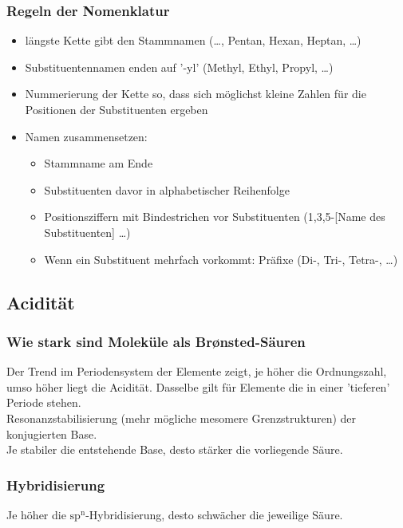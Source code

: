 \documentclass[a4paper, fleqn]{article}
\begin{document}
\subsubsection{Regeln der Nomenklatur}
\begin{itemize}
  \item l\"angste Kette gibt den Stammnamen (\dots , Pentan, Hexan, Heptan, \dots)
  \item Substituentennamen enden auf '-yl' (Methyl, Ethyl, Propyl, \dots)
  \item Nummerierung der Kette so, dass sich m\"oglichst kleine Zahlen f\"ur die Positionen der Substituenten ergeben
  \item Namen zusammensetzen: \begin{itemize}
    \item Stammname am Ende 
    \item Substituenten davor in alphabetischer Reihenfolge
    \item Positionsziffern mit Bindestrichen vor Substituenten (1,3,5-[Name des Substituenten] \dots)
    \item Wenn ein Substituent mehrfach vorkommt: Pr\"afixe (Di-, Tri-, Tetra-, \dots)
  \end{itemize}
\end{itemize}

\subsection{Acidit\"at}
\subsubsection*{Wie stark sind Molek\"ule als Br\o nsted-S\"auren}
Der Trend im Periodensystem der Elemente zeigt, je h\"oher die Ordnungszahl, umso h\"oher liegt die Acidit\"at. Dasselbe gilt f\"ur Elemente die in einer 'tieferen' Periode stehen.\\
Resonanzstabilisierung (mehr m\"ogliche mesomere Grenzstrukturen) der konjugierten Base.\\
Je stabiler die entstehende Base, desto st\"arker die vorliegende S\"aure.\\

\subsubsection{Hybridisierung}
Je h\"oher die $\mathrm{sp^n}$-Hybridisierung, desto schw\"acher die jeweilige S\"aure. 
\end{document}
